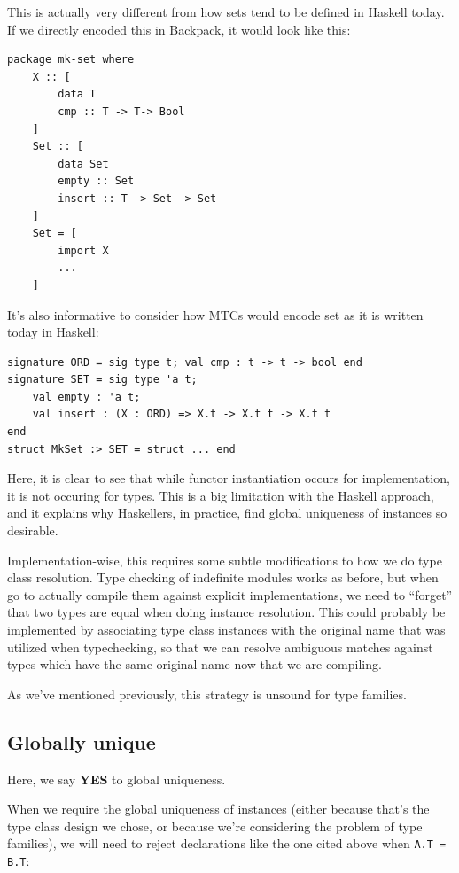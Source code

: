\documentclass{article}
\begin{document}
This is actually very different from how sets tend to be defined in
Haskell today.  If we directly encoded this in Backpack, it would
look like this:

\begin{verbatim}
package mk-set where
    X :: [
        data T
        cmp :: T -> T-> Bool
    ]
    Set :: [
        data Set
        empty :: Set
        insert :: T -> Set -> Set
    ]
    Set = [
        import X
        ...
    ]
\end{verbatim}

It's also informative to consider how MTCs would encode set as it is written
today in Haskell:

\begin{verbatim}
signature ORD = sig type t; val cmp : t -> t -> bool end
signature SET = sig type 'a t;
    val empty : 'a t;
    val insert : (X : ORD) => X.t -> X.t t -> X.t t
end
struct MkSet :> SET = struct ... end
\end{verbatim}

Here, it is clear to see that while functor instantiation occurs for
implementation, it is not occuring for types.  This is a big limitation
with the Haskell approach, and it explains why Haskellers, in practice,
find global uniqueness of instances so desirable.

Implementation-wise, this requires some subtle modifications to how we
do type class resolution.  Type checking of indefinite modules works as
before, but when go to actually compile them against explicit
implementations, we need to ``forget'' that two types are equal when
doing instance resolution.  This could probably be implemented by
associating type class instances with the original name that was
utilized when typechecking, so that we can resolve ambiguous matches
against types which have the same original name now that we are
compiling.

As we've mentioned previously, this strategy is unsound for type families.

\subsection{Globally unique}

Here, we say \textbf{YES} to global uniqueness.

When we require the global uniqueness of instances (either because
that's the type class design we chose, or because we're considering
the problem of type families), we will need to reject declarations like the
one cited above when \verb|A.T = B.T|:
\end{document}
